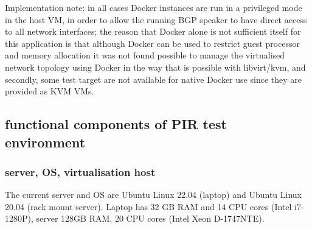 Implementation note: in all cases Docker instances are run in a privileged mode in the host VM, in order to allow the running BGP speaker to have direct access to all network interfaces; the reason that Docker alone is not sufficient itself for this application is that although Docker can be used to restrict guest processor and memory allocation it was not found possible to manage the virtualised network topology using Docker in the way that is possible with libvirt/kvm, and secondly, some test target are not available for native Docker use since they are provided as KVM VMs.







\NH{\rule{14cm}{0.4pt}}



\subsection{functional components of PIR test environment}

\subsubsection{server, OS, virtualisation host}

The current server and OS are Ubuntu Linux 22.04 (laptop) and Ubuntu Linux 20.04 (rack mount server).
Laptop has 32 GB RAM and 14 CPU cores (Intel i7-1280P), server 128GB RAM, 20 CPU cores (Intel Xeon D-1747NTE).


